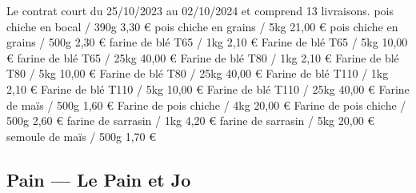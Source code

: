 \documentclass[8pt,a4paper,french]{article}
\makeatletter
\newcommand{\authoredby}[1]{\addtocontents{toc}{\protect\@nameuse{authoredby#1}}}%
\makeatother
\begin{document}
\noindent Le contrat court du 25/10/2023 au 02/10/2024 et comprend 13 livraisons.\newline\newline
{\color{Blue} pois chiche en bocal / 390g 3,30 € }\newline
{\color{Blue} pois chiche en grains / 5kg 21,00 € }\newline
{\color{Blue} pois chiche en grains / 500g 2,30 € }\newline
{\color{Blue} farine de blé T65 / 1kg 2,10 € }\newline
{\color{Blue} Farine de blé T65 / 5kg 10,00 €}\newline
{\color{Blue} farine de blé T65 / 25kg 40,00 € }\newline
{\color{Blue} Farine de blé T80 / 1kg 2,10 € }\newline
{\color{Blue} Farine de blé T80 / 5kg 10,00 € }\newline
{\color{Blue} Farine de blé T80 / 25kg 40,00 € }\newline
{\color{Blue} Farine de blé T110 / 1kg 2,10 € }\newline
{\color{Blue} Farine de blé T110 / 5kg 10,00 € }\newline
{\color{Blue} Farine de blé T110 / 25kg 40,00 €}\newline
{\color{Blue} Farine de maïs / 500g 1,60 €}\newline
{\color{Blue} Farine de pois chiche / 4kg 20,00 € }\newline
{\color{Blue} Farine de pois chiche / 500g 2,60 €}\newline
{\color{Blue} farine de sarrasin / 1kg 4,20 € }\newline
{\color{Blue} farine de sarrasin / 5kg 20,00 € }\newline
{\color{Blue} semoule de maïs / 500g 1,70 €}

\newpage

\authoredby{B}
\subsection{Pain --- Le Pain et Jo}
\end{document}
